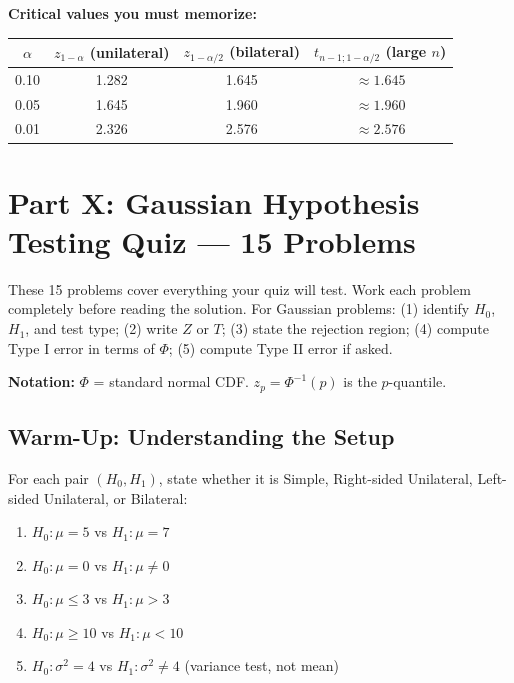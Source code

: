 \documentclass[11pt,a4paper]{article}
\newcounter{quizq}
\newenvironment{quizquestion}[1]{%
  \refstepcounter{quizq}%
  \begin{tcolorbox}[quizbox, title={Quiz Question \thequizq\ --- #1}]
}{%
  \end{tcolorbox}
}
\begin{document}
\begin{tcolorbox}[formulabox]
\textbf{Critical values you must memorize:}
\begin{center}
\begin{tabular}{@{}cccc@{}}
\toprule
$\alpha$ & $z_{1-\alpha}$ (unilateral) & $z_{1-\alpha/2}$ (bilateral) & $t_{n-1;1-\alpha/2}$ (large $n$)\\
\midrule
0.10 & 1.282 & 1.645 & $\approx 1.645$\\
0.05 & 1.645 & 1.960 & $\approx 1.960$\\
0.01 & 2.326 & 2.576 & $\approx 2.576$\\
\bottomrule
\end{tabular}
\end{center}
\end{tcolorbox}

\section{Part X: Gaussian Hypothesis Testing Quiz --- 15 Problems}

\begin{tcolorbox}[quizbox, title={Quiz instructions}]
These 15 problems cover everything your quiz will test. Work each problem completely before reading the solution. For Gaussian problems: (1) identify $H_0$, $H_1$, and test type; (2) write $Z$ or $T$; (3) state the rejection region; (4) compute Type I error in terms of $\Phi$; (5) compute Type II error if asked.

\textbf{Notation:} $\Phi$ = standard normal CDF. $z_p = \Phi^{-1}(p)$ is the $p$-quantile.
\end{tcolorbox}

\subsection{Warm-Up: Understanding the Setup}

\begin{quizquestion}{Identifying the test type}
For each pair $(H_0, H_1)$, state whether it is Simple, Right-sided Unilateral, Left-sided Unilateral, or Bilateral:
\begin{enumerate}[label=(\alph*)]
  \item $H_0:\mu=5$ vs $H_1:\mu=7$
  \item $H_0:\mu=0$ vs $H_1:\mu\neq 0$
  \item $H_0:\mu\leq 3$ vs $H_1:\mu>3$
  \item $H_0:\mu\geq 10$ vs $H_1:\mu<10$
  \item $H_0:\sigma^2=4$ vs $H_1:\sigma^2\neq 4$ \quad (variance test, not mean)
\end{enumerate}
\end{quizquestion}
\end{document}

